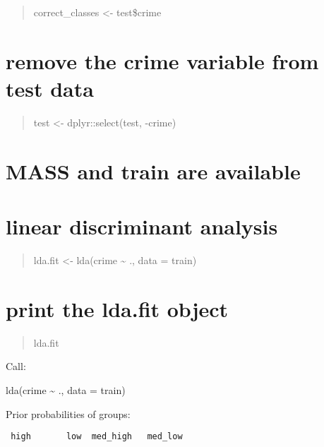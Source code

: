 \documentclass[]{article}
\begin{document}
\begin{quote}
correct\_classes \textless{}- test\$crime
\end{quote}

\begin{quote}
\end{quote}

\section{remove the crime variable from test
data}\label{remove-the-crime-variable-from-test-data}

\begin{quote}
test \textless{}- dplyr::select(test, -crime)
\end{quote}

\section{MASS and train are
available}\label{mass-and-train-are-available}

\begin{quote}
\end{quote}

\section{linear discriminant
analysis}\label{linear-discriminant-analysis}

\begin{quote}
lda.fit \textless{}- lda(crime \textasciitilde{} ., data = train)
\end{quote}

\begin{quote}
\end{quote}

\section{print the lda.fit object}\label{print-the-lda.fit-object}

\begin{quote}
lda.fit
\end{quote}

Call:

lda(crime \textasciitilde{} ., data = train)

Prior probabilities of groups:

\begin{verbatim}
 high       low  med_high   med_low  
\end{verbatim}
\end{document}
